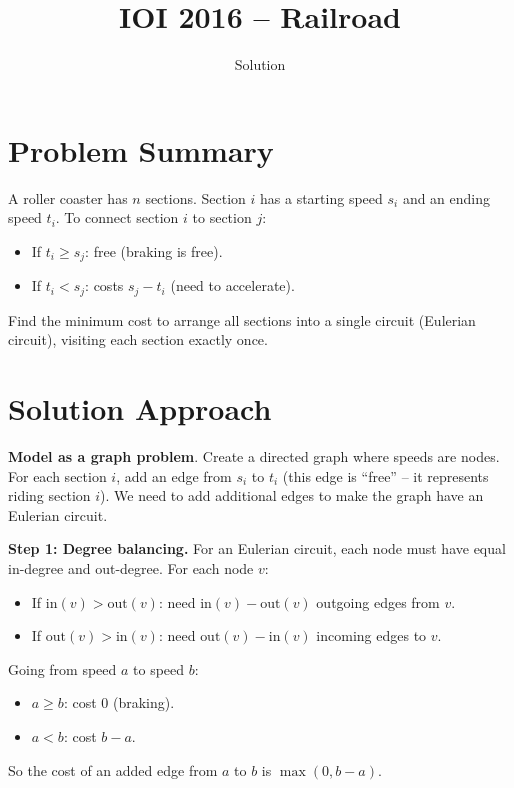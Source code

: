 \documentclass[11pt,a4paper]{article}
\title{IOI 2016 -- Railroad}
\author{Solution}
\date{}
\begin{document}
\maketitle

\section{Problem Summary}

A roller coaster has $n$ sections. Section $i$ has a starting speed $s_i$ and an ending speed $t_i$. To connect section $i$ to section $j$:
\begin{itemize}
  \item If $t_i \ge s_j$: free (braking is free).
  \item If $t_i < s_j$: costs $s_j - t_i$ (need to accelerate).
\end{itemize}

Find the minimum cost to arrange all sections into a single circuit (Eulerian circuit), visiting each section exactly once.

\section{Solution Approach}

\textbf{Model as a graph problem}. Create a directed graph where speeds are nodes. For each section $i$, add an edge from $s_i$ to $t_i$ (this edge is ``free'' -- it represents riding section $i$). We need to add additional edges to make the graph have an Eulerian circuit.

\textbf{Step 1: Degree balancing.} For an Eulerian circuit, each node must have equal in-degree and out-degree. For each node $v$:
\begin{itemize}
  \item If $\text{in}(v) > \text{out}(v)$: need $\text{in}(v) - \text{out}(v)$ outgoing edges from $v$.
  \item If $\text{out}(v) > \text{in}(v)$: need $\text{out}(v) - \text{in}(v)$ incoming edges to $v$.
\end{itemize}

Going from speed $a$ to speed $b$:
\begin{itemize}
  \item $a \ge b$: cost 0 (braking).
  \item $a < b$: cost $b - a$.
\end{itemize}

So the cost of an added edge from $a$ to $b$ is $\max(0, b - a)$.
\end{document}
